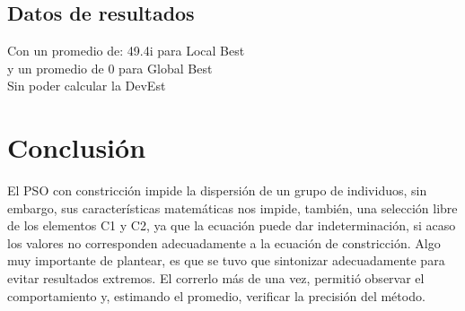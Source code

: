 \documentclass[12pt,letterpaper]{report}
\begin{document}
  \subsection*{Datos de resultados}
  \parbox{2.4in}{}
  \parbox{3in}{
  Con un promedio de: 49.4i para Local Best\\ y un promedio de 0 para Global Best\\ Sin poder calcular la DevEst\newpage}
  \section*{Conclusión}
  El PSO con constricción impide la dispersión de un grupo de individuos, sin embargo, sus características matemáticas
  nos impide, también, una selección libre de los elementos C1 y C2, ya que la ecuación puede dar indeterminación, si
  acaso los valores no corresponden adecuadamente a la ecuación de constricción. Algo muy importante de plantear, es que
  se tuvo que sintonizar adecuadamente para evitar resultados extremos. El correrlo más de una vez, permitió observar
  el comportamiento y, estimando el promedio, verificar la precisión del método.
\end{document}
